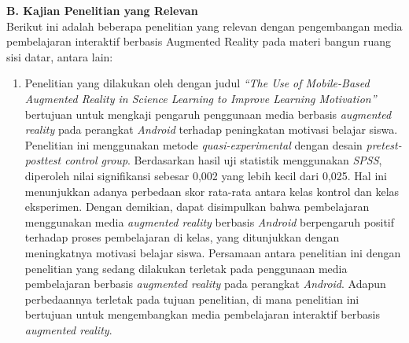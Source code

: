 \documentclass[12pt]{article}
\begin{document}
\textbf{B. Kajian Penelitian yang Relevan}\\
\hspace*{1cm}Berikut ini adalah beberapa penelitian yang relevan dengan pengembangan media pembelajaran interaktif berbasis Augmented Reality pada materi bangun ruang sisi datar, antara lain:
\begin{enumerate}
    \item Penelitian yang dilakukan oleh \citet{maulana2020} dengan judul \textit{“The Use of Mobile-Based Augmented Reality in Science Learning to Improve Learning Motivation”} bertujuan untuk mengkaji pengaruh penggunaan media berbasis \textit{augmented reality} pada perangkat \textit{Android} terhadap peningkatan motivasi belajar siswa. Penelitian ini menggunakan metode \textit{quasi-experimental} dengan desain \textit{pretest-posttest control group}. Berdasarkan hasil uji statistik menggunakan \textit{SPSS}, diperoleh nilai signifikansi sebesar 0{,}002 yang lebih kecil dari 0{,}025. Hal ini menunjukkan adanya perbedaan skor rata-rata antara kelas kontrol dan kelas eksperimen. Dengan demikian, dapat disimpulkan bahwa pembelajaran menggunakan media \textit{augmented reality} berbasis \textit{Android} berpengaruh positif terhadap proses pembelajaran di kelas, yang ditunjukkan dengan meningkatnya motivasi belajar siswa.
    Persamaan antara penelitian ini dengan penelitian yang sedang dilakukan terletak pada penggunaan media pembelajaran berbasis \textit{augmented reality} pada perangkat \textit{Android}. Adapun perbedaannya terletak pada tujuan penelitian, di mana penelitian ini bertujuan untuk mengembangkan media pembelajaran interaktif berbasis \textit{augmented reality}.

\end{enumerate}
\end{document}
